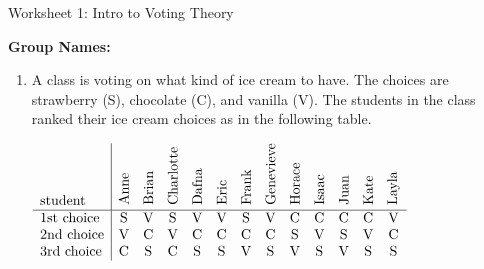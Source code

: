 \documentclass[12pt]{article}
\begin{document}
\begin{center}
{\Large  Worksheet 1:  Intro to Voting Theory}
\end{center}



\noindent \textbf{Group Names:} \hrulefill \\
          

\begin{enumerate}     

\item A class is voting on what kind of ice cream to have. The choices are strawberry (S), chocolate (C), and vanilla (V). The students in the class ranked their ice cream choices as in the following table.

$
\begin{array}{l|cccccccccccc}
\text{student} & \rotatebox{90}{Anne} & \rotatebox{90}{Brian} &\rotatebox{90}{Charlotte}&\rotatebox{90}{Dafna}&\rotatebox{90}{Eric}&\rotatebox{90}{Frank}&\rotatebox{90}{Genevieve}&\rotatebox{90}{Horace}&\rotatebox{90}{Isaac} & \rotatebox{90}{Juan} & \rotatebox{90}{Kate} & \rotatebox{90}{Layla}\\ \hline
%
%
\text{1st choice}&  \text{S} & \text{V} & \text{S} & \text{V}
   & \text{V} & \text{S} & \text{V} &
   \text{C} & \text{C} & \text{C} & \text{C} & \text{V} \\
   \text{2nd choice} & \text{V} & \text{C} & \text{V} & \text{C}
   & \text{C} & \text{C} & \text{C} &
   \text{S} & \text{V} & \text{S} & \text{V} & \text{C} \\
   \text{3rd choice}& \text{C} & \text{S} & \text{C} & \text{S}
   & \text{S} & \text{V} & \text{S} &
   \text{V} & \text{S} & \text{V} &\text{S} & \text{S} \\\end{array}
$


\end{enumerate}
\end{document}
